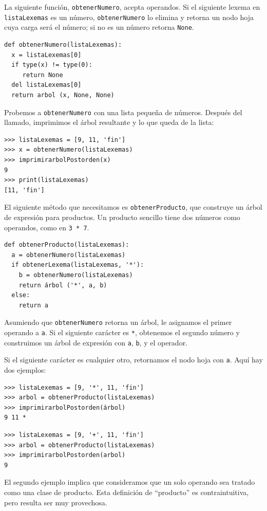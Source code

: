 La siguiente función, \texttt{obtenerNumero}, acepta operandos. Si
el siguiente lexema en \texttt{listaLexemas} es un número, \texttt{obtenerNumero}
lo elimina y retorna un nodo hoja cuya carga será el número; si no
es un número retorna \texttt{None}.

\beforeverb 
\begin{verbatim}
def obtenerNumero(listaLexemas):
  x = listaLexemas[0]
  if type(x) != type(0): 
     return None
  del listaLexemas[0]
  return arbol (x, None, None)
\end{verbatim}
\afterverb Probemos a \texttt{obtenerNumero} con una lista pequeña
de números. Después del llamado, imprimimos el árbol resultante y
lo que queda de la lista:

\beforeverb 
\begin{verbatim}
>>> listaLexemas = [9, 11, 'fin']
>>> x = obtenerNumero(listaLexemas)
>>> imprimirarbolPostorden(x)
9
>>> print(listaLexemas)
[11, 'fin']
\end{verbatim}
\afterverb El siguiente método que necesitamos es \texttt{obtenerProducto},
que construye un árbol de expresión para productos. Un producto sencillo
tiene dos números como operandos, como en \texttt{3 {*} 7}.

\beforeverb 
\begin{verbatim}
def obtenerProducto(listaLexemas):
  a = obtenerNumero(listaLexemas)
  if obtenerLexema(listaLexemas, '*'):
    b = obtenerNumero(listaLexemas)
    return árbol ('*', a, b)
  else:
    return a
\end{verbatim}
\afterverb Asumiendo que \texttt{obtenerNumero} retorna un árbol,
le asignamos el primer operando a \texttt{a}. Si el siguiente carácter
es \texttt{{*}}, obtenemos el segundo número y construimos un árbol
de expresión con \texttt{a}, \texttt{b}, y el operador.

Si el siguiente carácter es cualquier otro, retornamos el nodo hoja
con \texttt{a}. Aquí hay dos ejemplos:

\beforeverb 
\begin{verbatim}
>>> listaLexemas = [9, '*', 11, 'fin']
>>> arbol = obtenerProducto(listaLexemas)
>>> imprimirarbolPostorden(árbol)
9 11 *
\end{verbatim}
\afterverb

\beforeverb 
\begin{verbatim}
>>> listaLexemas = [9, '+', 11, 'fin']
>>> arbol = obtenerProducto(listaLexemas)
>>> imprimirarbolPostorden(arbol)
9
\end{verbatim}
\afterverb El segundo ejemplo implica que consideramos que un solo
operando sea tratado como una clase de producto. Esta definición de
``producto'' es contraintuitiva, pero resulta ser muy provechosa.

